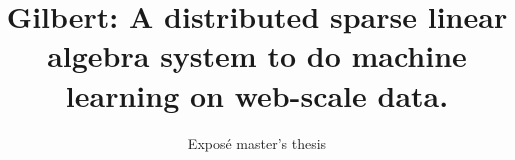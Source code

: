 \documentclass{dima}
\begin{document}

\title{Gilbert: A distributed sparse linear algebra system to do machine learning on web-scale data.}
\subtitle{Exposé master's thesis}


%
%
%
%


\author{
%
%
}
\end{document}
